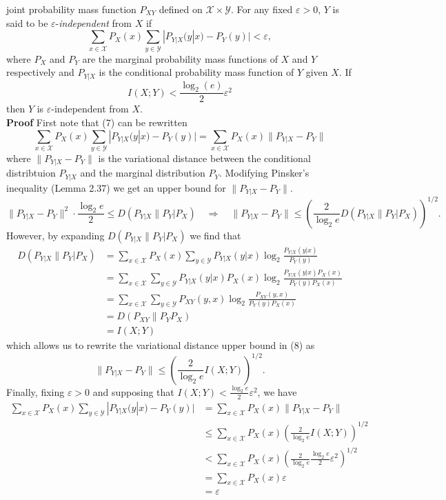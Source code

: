 \documentclass[11pt, letterpaper]{article}
\newcommand{\mc}[1]{\mathcal{#1}}
\begin{document}
joint probability mass function $P_{XY}$ defined on $\mc{X}\times\mc{Y}$. For any fixed $\varepsilon>0$, $Y$ is said to be $\varepsilon$-{\it independent}
from $X$ if
\[\sum_{x\in\mc{X}}P_X(x)\sum_{y\in\mc{Y}}|P_{Y|X}(y|x)-P_Y(y)|<\varepsilon,\tag{7}\]
where $P_X$ and $P_Y$ are the marginal probability mass functions of $X$ and $Y$ respectively and $P_{Y|X}$ is the conditional probability mass function
of $Y$ given $X$. If
\[I(X;Y)<\frac{\log_2(e)}{2}\varepsilon^2\]
then $Y$ is $\varepsilon$-independent from $X$.\\[10pt]
{\bf Proof} First note that (7) can be rewritten
\[\sum_{x\in\mc{X}}P_X(x)\sum_{y\in\mc{Y}}|P_{Y|X}(y|x)-P_Y(y)|=\sum_{x\in\mc{X}}P_X(x)\|P_{Y|X}-P_Y\|\]
where $\|P_{Y|X}-P_Y\|$ is the variational distance between the conditional distribtuion $P_{Y|X}$ and the marginal distribution $P_Y$. Modifying Pinsker's inequality (Lemma 2.37)
we get an upper bound for $\|P_{Y|X}-P_Y\|$.
\[\|P_{Y|X}-P_Y\|^2\cdot\frac{\log_2e}{2}\leq D(P_{Y|X}\|P_Y|P_X)\quad\Rightarrow\quad\|P_{Y|X}-P_Y\|\leq\left(\frac{2}{\log_2e}D(P_{Y|X}\|P_Y|P_X)\right)^{1/2}.\tag{8}\]
However, by expanding $D(P_{Y|X}\|P_Y|P_X)$ we find that
\begin{align*}
    D(P_{Y|X}\|P_Y|P_X)&=\sum_{x\in\mc{X}}P_X(x)\sum_{y\in\mc{Y}}P_{Y|X}(y|x)\log_2\frac{P_{Y|X}(y|x)}{P_Y(y)}\\
    &=\sum_{x\in\mc{X}}\sum_{y\in\mc{Y}}P_{Y|X}(y|x)P_X(x)\log_2\frac{P_{Y|X}(y|x)P_X(x)}{P_Y(y)P_X(x)}\\
    &=\sum_{x\in\mc{X}}\sum_{y\in\mc{Y}}P_{XY}(y,x)\log_2\frac{P_{XY}(y,x)}{P_Y(y)P_X(x)}\\
    &=D(P_{XY}\|P_YP_X)\\
    &=I(X;Y)
\end{align*}
which allows us to rewrite the variational distance upper bound in (8) as
\[\|P_{Y|X}-P_Y\|\leq\left(\frac{2}{\log_2e}I(X;Y)\right)^{1/2}.\]
Finally, fixing $\varepsilon>0$ and supposing that $I(X;Y)<\frac{\log_2e}{2}\varepsilon^2$, we have
\begin{align*}
    \sum_{x\in\mc{X}}P_X(x)\sum_{y\in\mc{Y}}|P_{Y|X}(y|x)-P_Y(y)|&=\sum_{x\in\mc{X}}P_X(x)\|P_{Y|X}-P_Y\|\\
    &\leq\sum_{x\in\mc{X}}P_X(x)\left(\frac{2}{\log_2e}I(X;Y)\right)^{1/2}\\
    &<\sum_{x\in\mc{X}}P_X(x)\left(\frac{2}{\log_2e}\frac{\log_2e}{2}\varepsilon^2\right)^{1/2}\\
    &=\sum_{x\in\mc{X}}P_X(x)\varepsilon\\
    &=\varepsilon
\end{align*}
\end{document}
